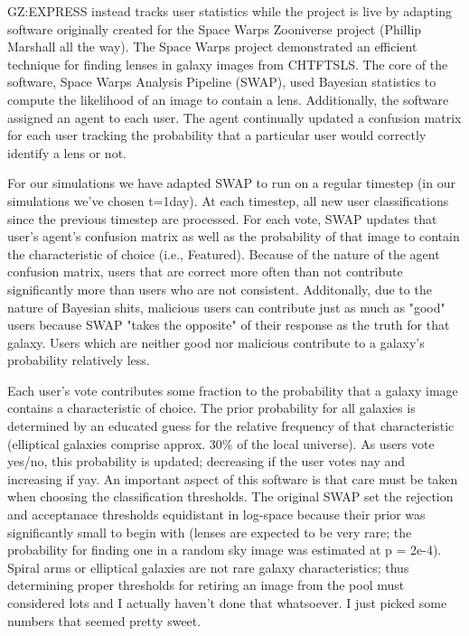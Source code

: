 \documentclass[twocolumn]{aastex6}
\begin{document}
GZ:EXPRESS instead tracks user statistics while the project is live by adapting software originally created for the Space Warps Zooniverse project (Phillip Marshall all the way). The Space Warps project demonstrated an efficient technique for finding lenses in galaxy images from CHTFTSLS. The core of the software, Space Warps Analysis Pipeline (SWAP), used Bayesian statistics to compute the likelihood of an image to contain a lens. Additionally, the software assigned an agent to each user. The agent continually updated a confusion matrix for each user tracking the probability that a particular user would correctly identify a lens or not.  

For our simulations we have adapted SWAP to run on a regular timestep (in our simulations we've chosen t=1day). At each timestep, all new user classifications since the previous timestep are processed. For each vote, SWAP updates that user's agent's confusion matrix as well as the probability of that image to contain the characteristic of choice (i.e., Featured). Because of the nature of the agent confusion matrix,  users that are correct more often than not contribute significantly more than users who are not consistent. Additonally, due to the nature of Bayesian shits, malicious users can contribute just as much as "good" users because SWAP "takes the opposite" of their response as the truth for that galaxy. Users which are neither good nor malicious contribute to a galaxy's probability relatively less.

Each user's vote contributes some fraction to the probability that a galaxy image contains a characteristic of choice. The prior probability for all galaxies is determined by an educated guess for the relative frequency of that characteristic (elliptical galaxies comprise approx. 30\% of the local universe). As users vote yes/no, this probability is updated; decreasing if the user votes nay and increasing if yay. An important aspect of this software is that care must be taken when choosing the classification thresholds. The original SWAP set the rejection and acceptanace thresholds equidistant in log-space because their prior was significantly small to begin with (lenses are expected to be very rare; the probability for finding one in a random sky image was estimated at p = 2e-4).  Spiral arms or elliptical galaxies are not rare galaxy characteristics; thus determining proper thresholds for retiring an image from the pool must considered lots and I actually haven't done that whatsoever. I just picked some numbers that seemed pretty sweet. 
\end{document}

